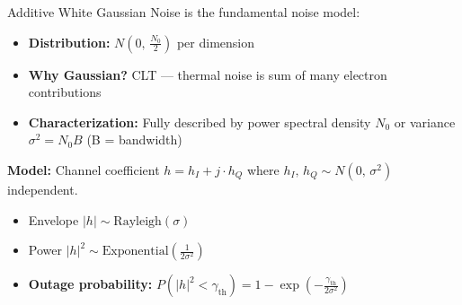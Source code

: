 
Additive White Gaussian Noise is the fundamental noise model:

\begin{itemize}
\tightlist
\item
  \textbf{Distribution:} $N\left(0,\, \frac{N_{0}}{2}\right)$ per dimension
\item
  \textbf{Why Gaussian?} CLT — thermal noise is sum of many electron contributions
\item
  \textbf{Characterization:} Fully described by power spectral density $N_{0}$ or variance $\sigma^{2} = N_{0}B$ (B = bandwidth)
\end{itemize}


\textbf{Model:} Channel coefficient $h = h_{I} + j \cdot h_{Q}$ where $h_{I},\, h_{Q} \sim N(0,\, \sigma^{2})$ independent.

\begin{itemize}
\tightlist
\item
  Envelope $\lvert h\rvert \sim \mathrm{Rayleigh}(\sigma)$
\item
  Power $\lvert h\rvert^{2} \sim \mathrm{Exponential}\left(\frac{1}{2\sigma^{2}}\right)$
\item
  \textbf{Outage probability:} $P(\lvert h\rvert^{2} < \gamma_{\mathrm{th}}) = 1 - \exp \left(-\frac{\gamma_{\mathrm{th}}}{2\sigma^{2}}\right)$
\end{itemize}


